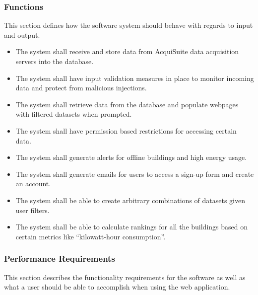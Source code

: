     \subsubsection{Functions}
    This section defines how the software system should behave with regards to input and output.
    \begin{itemize}
        \setlength\itemsep{1mm}
        \item The system shall receive and store data from AcquiSuite data acquisition servers into the database. 
        \item The system shall have input validation measures in place to monitor incoming data and protect from malicious injections.
        \item The system shall retrieve data from the database and populate webpages with filtered datasets when prompted.
        \item The system shall have permission based restrictions for accessing certain data.
        \item The system shall generate alerts for offline buildings and high energy usage.
        \item The system shall generate emails for users to access a sign-up form and create an account.
        \item The system shall be able to create arbitrary combinations of datasets given user filters.
        \item The system shall be able to calculate rankings for all the buildings based on certain metrics like ``kilowatt-hour consumption''.
    \end{itemize}

    \subsubsection{Performance Requirements}
    This section describes the functionality requirements for the software as well as what a user should be able to accomplish when using the web application.


